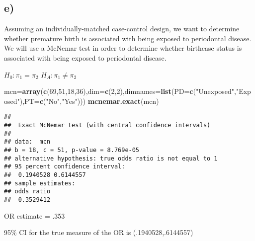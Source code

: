 \documentclass[]{article}
\newenvironment{Shaded}{\begin{snugshade}}{\end{snugshade}}
\newcommand{\KeywordTok}[1]{\textcolor[rgb]{0.13,0.29,0.53}{\textbf{#1}}}
\newcommand{\DataTypeTok}[1]{\textcolor[rgb]{0.13,0.29,0.53}{#1}}
\newcommand{\DecValTok}[1]{\textcolor[rgb]{0.00,0.00,0.81}{#1}}
\newcommand{\StringTok}[1]{\textcolor[rgb]{0.31,0.60,0.02}{#1}}
\newcommand{\OperatorTok}[1]{\textcolor[rgb]{0.81,0.36,0.00}{\textbf{#1}}}
\newcommand{\NormalTok}[1]{#1}
\begin{document}
\subsection{e)}\label{e-1}

Assuming an individually-matched case-control design, we want to
determine whether premature birth is associated with being exposed to
periodontal disease. We will use a McNemar test in order to determine
whether birthcase status is associated with being exposed to periodontal
disease.

\(H_0: \pi_1=\pi_2\) \(H_A: \pi_1 \neq \pi_2\)

\begin{Shaded}
\end{Shaded}

\begin{Shaded}
\begin{Highlighting}[]
\NormalTok{mcn=}\KeywordTok{array}\NormalTok{(}\KeywordTok{c}\NormalTok{(}\DecValTok{69}\NormalTok{,}\DecValTok{51}\NormalTok{,}\DecValTok{18}\NormalTok{,}\DecValTok{36}\NormalTok{),}\DataTypeTok{dim=}\KeywordTok{c}\NormalTok{(}\DecValTok{2}\NormalTok{,}\DecValTok{2}\NormalTok{),}\DataTypeTok{dimnames=}\KeywordTok{list}\NormalTok{(}\DataTypeTok{PD=}\KeywordTok{c}\NormalTok{(}\StringTok{"Unexposed"}\NormalTok{,}\StringTok{"Exposed"}\NormalTok{),}\DataTypeTok{PT=}\KeywordTok{c}\NormalTok{(}\StringTok{"No"}\NormalTok{,}\StringTok{"Yes"}\NormalTok{)))}
\KeywordTok{mcnemar.exact}\NormalTok{(mcn)}
\end{Highlighting}
\end{Shaded}

\begin{verbatim}
## 
##  Exact McNemar test (with central confidence intervals)
## 
## data:  mcn
## b = 18, c = 51, p-value = 8.769e-05
## alternative hypothesis: true odds ratio is not equal to 1
## 95 percent confidence interval:
##  0.1940528 0.6144557
## sample estimates:
## odds ratio 
##  0.3529412
\end{verbatim}

OR estimate = .353

95\% CI for the true measure of the OR is (.1940528,.6144557)
\end{document}
